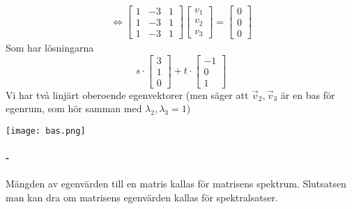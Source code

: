 \begin{Ex}
\begin{gather*}
		\Leftrightarrow
		\begin{bmatrix}
			1 & -3 & 1\\
			1 & -3 & 1\\
			1 & -3 & 1
		\end{bmatrix}
		\begin{bmatrix} v_1\\v_2\\v_3 \end{bmatrix}
		= \begin{bmatrix} 0\\0\\0 \end{bmatrix}
	\end{gather*}
	Som har lösningarna
	\[
	s \cdot \begin{bmatrix} 3\\1\\0 \end{bmatrix} + t \cdot \begin{bmatrix} -1\\0\\1 \end{bmatrix}
	\]
	Vi har två linjärt oberoende egenvektorer (men säger att $\vec{v}_2, \vec{v}_3$ är en bas för egenrum, som hör samman med $\lambda_2 ,\lambda_3 = 1$)\\
	\begin{center}
		\texttt{[image: bas.png]}
	\end{center}
\end{Ex}
\paragraph{-} %
\label{par:_}
Mängden av egenvärden till en matris kallas för matrisens spektrum. Slutsatsen man kan dra om matrisens egenvärden kallas för spektralsatser.

